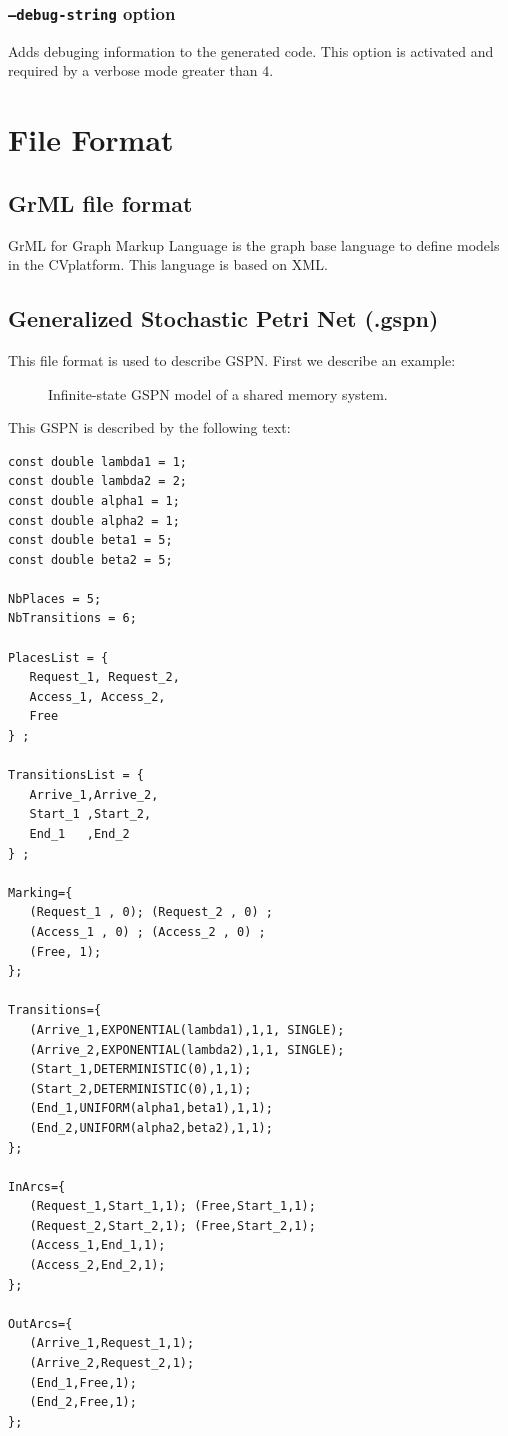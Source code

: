 \documentclass{article}
\newcommand{\cosyverif}{\mbox{\textup{C}\scalebox{0.75}{{\textsc{OSY}}}\textup{V}\scalebox{0.75}{{\textsc{ERIF}}}}}
\begin{document}
\subsubsection{\texttt{--debug-string} option}
Adds debuging information to the generated code. This option is activated
and required by a verbose mode greater than $4$.

 

\section{File Format}
\label{sec:fileformat}

\subsection{GrML file format}
GrML for Graph Markup Language is the graph base language to define
models in the \cosyverif platform. This language is based on XML.


\subsection{Generalized Stochastic Petri Net (.gspn)}
This file format is used to describe GSPN.
First we describe an example:\\
\begin{figure}[h]
  \centering
  
  \caption{Infinite-state GSPN  model of a shared memory system.}
  \label{fig:sharedmem}
\end{figure}
This GSPN is described by the following text:

\begin{scriptsize}
\begin{verbatim}
const double lambda1 = 1;
const double lambda2 = 2;
const double alpha1 = 1;
const double alpha2 = 1;
const double beta1 = 5;
const double beta2 = 5;

NbPlaces = 5;
NbTransitions = 6;

PlacesList = { 
   Request_1, Request_2,
   Access_1, Access_2,
   Free
} ;

TransitionsList = { 
   Arrive_1,Arrive_2,
   Start_1 ,Start_2,
   End_1   ,End_2
} ;

Marking={
   (Request_1 , 0); (Request_2 , 0) ; 
   (Access_1 , 0) ; (Access_2 , 0) ;
   (Free, 1);
};

Transitions={
   (Arrive_1,EXPONENTIAL(lambda1),1,1, SINGLE); 
   (Arrive_2,EXPONENTIAL(lambda2),1,1, SINGLE);
   (Start_1,DETERMINISTIC(0),1,1); 
   (Start_2,DETERMINISTIC(0),1,1);
   (End_1,UNIFORM(alpha1,beta1),1,1); 
   (End_2,UNIFORM(alpha2,beta2),1,1);
};

InArcs={
   (Request_1,Start_1,1); (Free,Start_1,1);
   (Request_2,Start_2,1); (Free,Start_2,1);
   (Access_1,End_1,1);
   (Access_2,End_2,1);
};

OutArcs={
   (Arrive_1,Request_1,1); 
   (Arrive_2,Request_2,1);
   (End_1,Free,1);
   (End_2,Free,1);
};
\end{verbatim}
\end{scriptsize}
\end{document}
